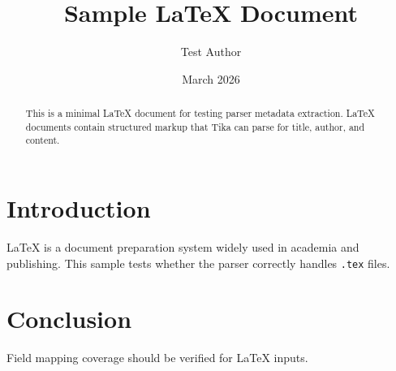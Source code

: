 \documentclass{article}
\title{Sample LaTeX Document}
\author{Test Author}
\date{March 2026}
\begin{document}
\maketitle

\begin{abstract}
This is a minimal LaTeX document for testing parser metadata extraction. LaTeX documents contain structured markup that Tika can parse for title, author, and content.
\end{abstract}

\section{Introduction}
LaTeX is a document preparation system widely used in academia and publishing. This sample tests whether the parser correctly handles \texttt{.tex} files.

\section{Conclusion}
Field mapping coverage should be verified for LaTeX inputs.
\end{document}
